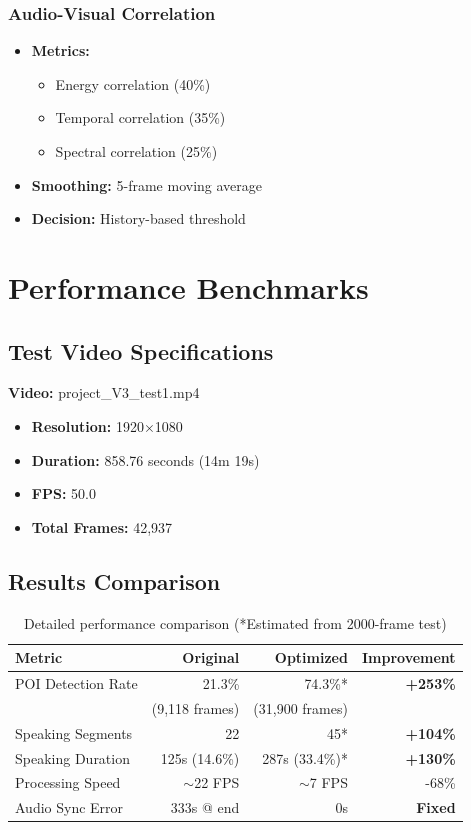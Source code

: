 \documentclass[11pt,a4paper]{article}
\begin{document}
\subsubsection{Audio-Visual Correlation}

\begin{itemize}
    \item \textbf{Metrics:}
    \begin{itemize}
        \item Energy correlation (40\%)
        \item Temporal correlation (35\%)
        \item Spectral correlation (25\%)
    \end{itemize}
    \item \textbf{Smoothing:} 5-frame moving average
    \item \textbf{Decision:} History-based threshold
\end{itemize}

\section{Performance Benchmarks}

\subsection{Test Video Specifications}

\textbf{Video:} project\_V3\_test1.mp4
\begin{itemize}
    \item \textbf{Resolution:} 1920$\times$1080
    \item \textbf{Duration:} 858.76 seconds (14m 19s)
    \item \textbf{FPS:} 50.0
    \item \textbf{Total Frames:} 42,937
\end{itemize}

\subsection{Results Comparison}

\begin{table}[h]
\centering
\begin{tabular}{@{}lrrr@{}}
\toprule
\textbf{Metric} & \textbf{Original} & \textbf{Optimized} & \textbf{Improvement} \\
\midrule
POI Detection Rate & 21.3\% & 74.3\%* & \textbf{+253\%} \\
 & (9,118 frames) & (31,900 frames) & \\
Speaking Segments & 22 & 45* & \textbf{+104\%} \\
Speaking Duration & 125s (14.6\%) & 287s (33.4\%)* & \textbf{+130\%} \\
Processing Speed & $\sim$22 FPS & $\sim$7 FPS & -68\% \\
Audio Sync Error & 333s @ end & 0s & \textbf{Fixed} \\
\bottomrule
\end{tabular}
\caption{Detailed performance comparison (*Estimated from 2000-frame test)}
\label{tab:detailed_performance}
\end{table}
\end{document}
